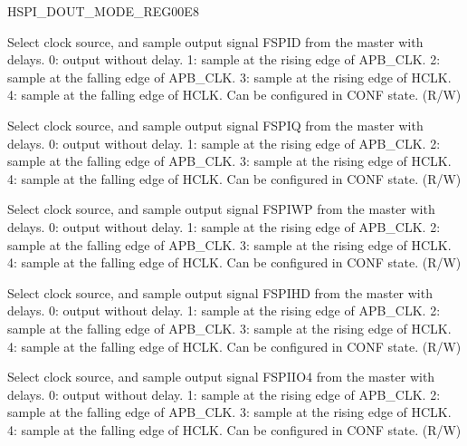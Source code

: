 \begin{register}{H}{SPI\_DOUT\_MODE\_REG}{\hexprefix{}00E8}\label{regdesc:SPIDOUTMODEREG}
%
%
%
%
%
%
%
%
%
\regnewline%
\begin{regdesc}\begin{reglist}
\label{fielddesc:SPIDOUT0MODE}\item [SPI\_DOUT0\_MODE]
Select clock source, and sample output signal FSPID from the master with delays. 0: output without delay. 1: sample at the rising edge of APB\_CLK. 2: sample at the falling edge of APB\_CLK. 3: sample at the rising edge of HCLK. 4: sample at the falling edge of HCLK. Can be configured in CONF state. (R/W)
\label{fielddesc:SPIDOUT1MODE}\item [SPI\_DOUT1\_MODE]
Select clock source, and sample output signal FSPIQ from the master with delays. 0: output without delay. 1: sample at the rising edge of APB\_CLK. 2: sample at the falling edge of APB\_CLK. 3: sample at the rising edge of HCLK. 4: sample at the falling edge of HCLK. Can be configured in CONF state. (R/W)
\label{fielddesc:SPIDOUT2MODE}\item [SPI\_DOUT2\_MODE] Select clock source, and sample output signal FSPIWP from the master with delays. 0: output without delay. 1: sample at the rising edge of APB\_CLK. 2: sample at the falling edge of APB\_CLK. 3: sample at the rising edge of HCLK. 4: sample at the falling edge of HCLK. Can be configured in CONF state. (R/W)
\label{fielddesc:SPIDOUT3MODE}\item [SPI\_DOUT3\_MODE] Select clock source, and sample output signal FSPIHD from the master with delays. 0: output without delay. 1: sample at the rising edge of APB\_CLK. 2: sample at the falling edge of APB\_CLK. 3: sample at the rising edge of HCLK. 4: sample at the falling edge of HCLK. Can be configured in CONF state. (R/W)
\label{fielddesc:SPIDOUT4MODE}\item [SPI\_DOUT4\_MODE] Select clock source, and sample output signal FSPIIO4 from the master with delays. 0: output without delay. 1: sample at the rising edge of APB\_CLK. 2: sample at the falling edge of APB\_CLK. 3: sample at the rising edge of HCLK. 4: sample at the falling edge of HCLK. Can be configured in CONF state. (R/W)

\end{reglist}
\end{regdesc}
\end{register}
